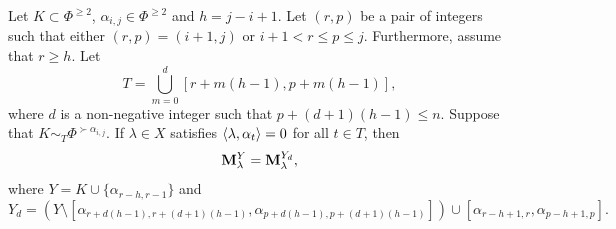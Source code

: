 \begin{lemma}\rm\label{co: bk corollary}
    Let $K\subset\Phi^{\geq 2}$, $\alpha_{i,j}\in \Phi^{\geq 2}$ and $h=j-i+1$. Let $(r,p)$ be a pair of integers such that either $(r,p)=(i+1,j)$ or  $i+1 < r \leq p \leq j$.  Furthermore, assume that 
    $r\geq h$. 
    Let $$T=\bigcup\limits_{m=0}^{d} [r+m(h-1),p + m(h-1)], $$
    where $d$ is a non-negative integer such that $p+(d+1)(h-1) \leq n$. Suppose  that $K\sim_{T} \Phi^{\succ \alpha_{i,j}}$. If $\lambda\in X$ satisfies $\langle \lambda , \alpha_t \rangle =0$ for all $t\in T$, then 
    \begin{equation} \label{eq: bk corollary}
        \mathbf{M}_{\lambda}^{Y} = \mathbf{M}_{\lambda}^{Y_{d}},
    \end{equation}
    where $Y=K\cup \{\alpha_{r-h,r-1}\}$ and
    $$Y_{d} = (Y\setminus [\alpha_{r+d(h-1),r+(d+1)(h-1)},\alpha_{p+d(h-1),p+(d+1)(h-1)}]) \cup [\alpha_{r-h+1,r},\alpha_{p-h+1,p}].$$
\end{lemma}


